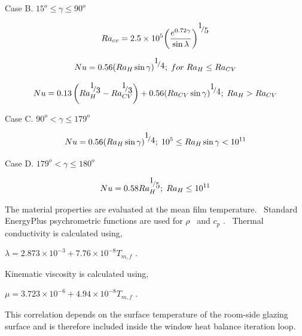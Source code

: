 Case B. \(15^o \leq \gamma \leq 90^o\)

\begin{equation}
R{a_{cv}} = 2.5 \times {10^5}{\left( {\frac{{{e^{0.72\gamma }}}}{{\sin \lambda }}} \right)^{{\raise0.7ex\hbox{1} \!\mathord{\left/ {\vphantom {1 5}}\right.}\!\lower0.7ex\hbox{5}}}}
\end{equation}

\begin{equation}
Nu = 0.56{\left( {R{a_H}\sin \gamma } \right)^{{\raise0.7ex\hbox{1} \!\mathord{\left/ {\vphantom {1 4}}\right.}\!\lower0.7ex\hbox{4}}}};\;for\;R{a_H} \le R{a_{CV}}
\end{equation}

\begin{equation}
Nu = 0.13\left( {Ra_H^{{\raise0.7ex\hbox{1} \!\mathord{\left/ {\vphantom {1 3}}\right.}\!\lower0.7ex\hbox{3}}} - Ra_{CV}^{{\raise0.7ex\hbox{1} \!\mathord{\left/ {\vphantom {1 3}}\right.}\!\lower0.7ex\hbox{3}}}} \right) + 0.56{\left( {R{a_{CV}}\sin \gamma } \right)^{{\raise0.7ex\hbox{1} \!\mathord{\left/ {\vphantom {1 4}}\right.}\!\lower0.7ex\hbox{4}}}};\;R{a_H} > R{a_{CV}}
\end{equation}

Case C. \(90^o < \gamma \leq 179^o\)

\begin{equation}
Nu = 0.56{\left( {R{a_H}\sin \gamma } \right)^{{\raise0.7ex\hbox{1} \!\mathord{\left/ {\vphantom {1 4}}\right.}\!\lower0.7ex\hbox{4}}}};\;{10^5} \le R{a_H}\sin \gamma  < {10^{11}}
\end{equation}

Case D. \(179^o < \gamma \leq 180^o\)

\begin{equation}
Nu = 0.58Ra_H^{{\raise0.7ex\hbox{1} \!\mathord{\left/ {\vphantom {1 5}}\right.}\!\lower0.7ex\hbox{5}}};\;R{a_H} \le {10^{11}}
\end{equation}

The material properties are evaluated at the mean film temperature.~ Standard EnergyPlus psychrometric functions are used for \(\rho\) ~and \({c_p}\) .~ Thermal conductivity is calculated using,

\(\lambda = 2.873 \times {10^{ - 3}} + 7.76 \times {10^{ - 8}}{T_{m,f}}\) .

Kinematic viscosity is calculated using,

\(\mu = 3.723 \times {10^{ - 6}} + 4.94 \times {10^{ - 8}}{T_{m,f}}\) .

This correlation depends on the surface temperature of the room-side glazing surface and is therefore included inside the window heat balance iteration loop.

